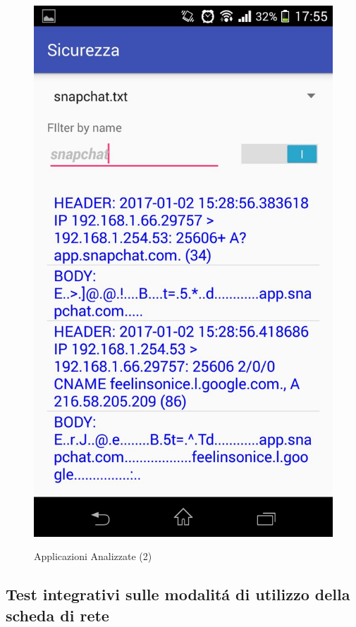 \documentclass[12pt]{article} %
\begin{document}
\begin{figure}[htbp]
{\includegraphics[scale=0.2]{./snap.jpeg}}
\caption{Applicazioni Analizzate (2)\label{fig:app2}}
\end{figure}

\subsection{Test integrativi sulle modalit\'a di utilizzo della scheda di rete}

\end{document}
